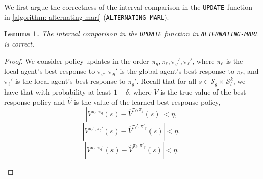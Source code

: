 \documentclass{article}
\theoremstyle{plain}
\newtheorem{lemma}[theorem]{Lemma}
\theoremstyle{definition}
\begin{document}
We first argue the correctness of the interval comparison in the \texttt{UPDATE} function in \cref{algorithm: alternating marl} (\texttt{ALTERNATING-MARL}).
\begin{lemma}
   The interval comparison in the \emph{\texttt{UPDATE}} function in \emph{\texttt{ALTERNATING-MARL}} is correct.\label{lemma: correctness of interval comparison} 
\end{lemma}
\begin{proof}We consider policy updates in the order $\pi_g, \pi_\ell, \pi_g', \pi_\ell'$, where $\pi_\ell$ is the local agent's best-response to $\pi_g$, $\pi_g'$ is the global agent's best-response to $\pi_\ell$, and $\pi_\ell'$ is the local agent's best-response to $\pi_g'$. Recall that for all $s\in\mathcal{S}_g\times\mathcal{S}_l^k$, we have that with probability at least $1-\delta$, where $V$ is the true value of the best-response policy and $\hat{V}$ is the value of the learned best-response policy,
 \begin{equation}|V^{\pi_\ell,\pi_g}(s) - \hat{V}^{\pi_\ell,\pi_g}(s)| < \eta,\end{equation}
    \begin{equation}|V^{\pi_\ell',\pi_g'}(s) - \hat{V}^{\pi_\ell',\pi'_g}(s)| < \eta,\end{equation}    \begin{equation}|V^{\pi_\ell,\pi_g'}(s) - \hat{V}^{\pi_\ell,\pi'_g}(s)| < \eta.\end{equation}





\begin{figure}[t]
\centering
{}
\end{figure}
\end{proof}
\end{document}
